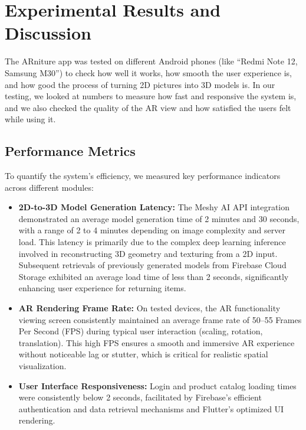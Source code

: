 \documentclass[12pt, a4paper]{article}
\begin{document}
\section{Experimental Results and Discussion}
The ARniture app was tested on different Android phones (like ``Redmi Note 12, Samsung M30'') to check how well it works, how smooth the user experience is, and how good the process of turning 2D pictures into 3D models is. In our testing, we looked at numbers to measure how fast and responsive the system is, and we also checked the quality of the AR view and how satisfied the users felt while using it.

\subsection{Performance Metrics}
To quantify the system's efficiency, we measured key performance indicators across different modules:
\begin{itemize}
    \item \textbf{2D-to-3D Model Generation Latency:} The Meshy AI API integration demonstrated an average model generation time of 2 minutes and 30 seconds, with a range of 2 to 4 minutes depending on image complexity and server load. This latency is primarily due to the complex deep learning inference involved in reconstructing 3D geometry and texturing from a 2D input. Subsequent retrievals of previously generated models from Firebase Cloud Storage exhibited an average load time of less than 2 seconds, significantly enhancing user experience for returning items.
    \item \textbf{AR Rendering Frame Rate:} On tested devices, the AR functionality viewing screen consistently maintained an average frame rate of 50--55 Frames Per Second (FPS) during typical user interaction (scaling, rotation, translation). This high FPS ensures a smooth and immersive AR experience without noticeable lag or stutter, which is critical for realistic spatial visualization.
    \item \textbf{User Interface Responsiveness:} Login and product catalog loading times were consistently below 2 seconds, facilitated by Firebase's efficient authentication and data retrieval mechanisms and Flutter's optimized UI rendering.
\end{itemize}
\end{document}
